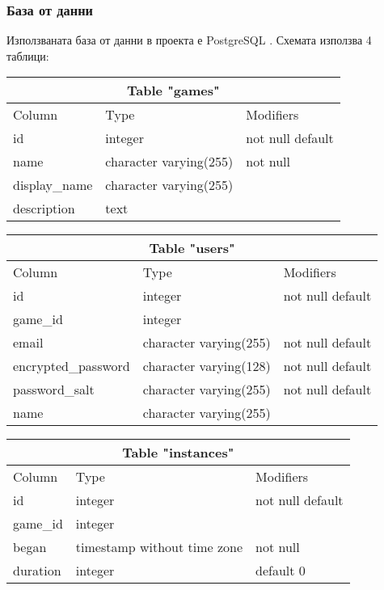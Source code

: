 \documentclass[a4paper]{article}
\begin{document}
\subsubsection{База от данни}

Използваната база от данни в проекта е PostgreSQL \cite{postgresql}.
Схемата използва 4 таблици:

\begin{tabular} { | l | l | l | }
\multicolumn{3}{c}{Table "games"} \\
\hline
Column & Type & Modifiers \\
\hline
id & integer & not null default \\
name & character varying(255) & not null \\
display\_name & character varying(255) & \\
description & text & \\
\hline
\end{tabular}

\vspace{10 pt}

\begin{tabular} { | l | l | l | }
\multicolumn{3}{c}{Table "users"} \\
\hline
Column & Type & Modifiers \\
\hline
id & integer & not null default \\
game\_id & integer & \\
email & character varying(255) & not null default \\
encrypted\_password & character varying(128) & not null default \\
password\_salt & character varying(255) & not null default \\
name & character varying(255) & \\ 
\hline
\end{tabular}

\vspace{10 pt}

\begin{tabular} { | l | l | l | }
\multicolumn{3}{c}{Table "instances"} \\
\hline
Column & Type & Modifiers \\
\hline
id & integer & not null default \\
game\_id  & integer                     & \\
began    & timestamp without time zone & not null \\
duration & integer                     & default 0 \\
\hline
\end{tabular}
\end{document}
